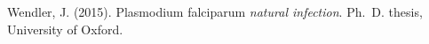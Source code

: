 \documentclass{bioinfo}
\begin{document}
\begin{thebibliography}{}
Wendler, J. (2015).
 {P}lasmodium falciparum {\em natural infection}.
\newblock Ph.\ D. thesis, University of Oxford.


\end{thebibliography}
\end{document}
